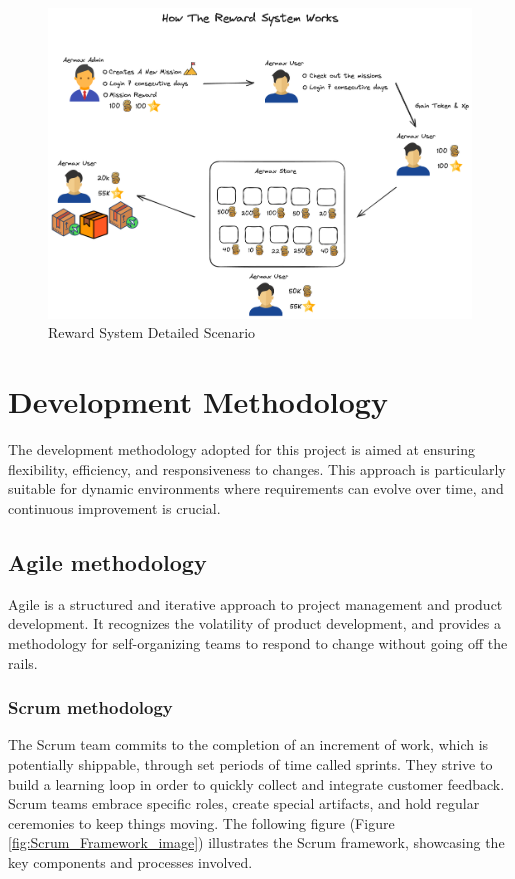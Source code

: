 \begin{figure}[H]
    \centering
    \includegraphics[width=1\textwidth]{src/assets/diagrams/rewardexplain2.png}
    \caption{Reward System Detailed Scenario}
    \label{fig:Reward_System_detailed_explain_image}
\end{figure}
   
\section{Development Methodology}
The development methodology adopted for this project is aimed at ensuring flexibility, efficiency, and responsiveness to changes. This approach is particularly suitable for dynamic environments where requirements can evolve over time, and continuous improvement is crucial.

\subsection{Agile methodology}
Agile is a structured and iterative approach to project management and product development.
It recognizes the volatility of product development, and provides a methodology for self-organizing teams to respond to change without going off the rails.

\subsubsection{Scrum methodology}
The Scrum team commits to the completion of an increment of work, which is potentially shippable, through set periods of time called sprints. They strive to build a learning loop in order to quickly collect and integrate customer feedback. Scrum teams embrace specific roles, create special artifacts, and hold regular ceremonies to keep things moving. The following figure (Figure \ref{fig:Scrum_Framework_image}) illustrates the Scrum framework, showcasing the key components and processes involved.

